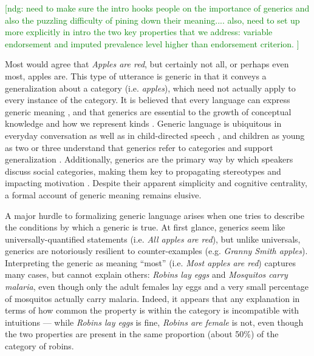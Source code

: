 \documentclass[10pt,letterpaper]{article}
\newcommand{\ndg}[1]{\textcolor{Green}{[ndg: #1]}}
\begin{document}
\ndg{need to make sure the intro hooks people on the importance of generics and also the puzzling difficulty of pining down their meaning.... also, need to set up more explicitly in intro the two key properties that we address: variable endorsement and imputed prevalence level higher than endorsement criterion. }


Most would agree that \emph{Apples are red}, but certainly not all, or perhaps even most, apples are.
This type of utterance is generic \cite{Carlson1977, Leslie2008} in that it conveys a generalization about a category (i.e. \emph{apples}), which  need not actually apply to every instance of the category.  
It is believed that every language can express generic meaning \cite{Behrens2005, Carlson1995}, and that generics are essential to the growth of conceptual knowledge \cite{Gelman2004} and how we represent kinds \cite{Leslie2008}.
Generic language is ubiquitous in everyday conversation as well as in child-directed speech \cite{Gelman2008}, and children as young as two or three understand that generics refer to categories and support generalization \cite{Cimpian2008}.
Additionally, generics are the primary way by which speakers discuss social categories, making them key to propagating stereotypes \cite{GelmanEtAl2004, Rhodes2012, Leslie2015} and impacting motivation \cite{Cimpian2010motivation}.
Despite their apparent simplicity and cognitive centrality, a formal account of generic meaning remains elusive.

A major hurdle to formalizing generic language arises when one tries to describe the conditions by which a generic is true.
At first glance, generics seem like universally-quantified statements (i.e. \emph{All apples are red}), but unlike universals, generics are notoriously resilient to counter-examples (e.g. \emph{Granny Smith apples}). 
Interpreting the generic as meaning ``most'' (i.e. \emph{Most apples are red}) captures many cases, but cannot explain others: \emph{Robins lay eggs} and \emph{Mosquitos carry malaria}, even though only the adult females lay eggs and a very small percentage of mosquitos actually carry malaria.
Indeed, it appears that any explanation in terms of how common the property is within the category is incompatible with intuitions --- while \emph{Robins lay eggs} is fine, \emph{Robins are female} is not, even though the two properties are present in the same proportion (about 50\%) of the category of robins.
\end{document}
